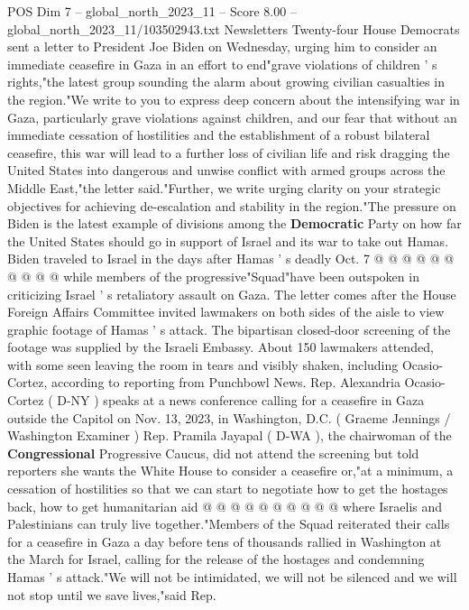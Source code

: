 \begin{textsample}{POS Dim 7 – global\_north\_2023\_11 – Score 8.00 – global\_north\_2023\_11/103502943.txt}  \label{ex:f7_pos_136}
Newsletters Twenty-four House Democrats sent a letter to President Joe Biden on Wednesday, urging him to consider an immediate ceasefire in Gaza in an effort to end"grave violations of children ' s rights,"the latest group sounding the alarm about growing civilian casualties in the region."We write to you to express deep concern about the intensifying war in Gaza, particularly grave violations against children, and our fear that without an immediate cessation of hostilities and the establishment of a robust bilateral ceasefire, this war will lead to a further loss of civilian life and risk dragging the United States into dangerous and unwise conflict with armed groups across the Middle East,"the letter said."Further, we write urging clarity on your strategic objectives for achieving de-escalation and stability in the region."The pressure on Biden is the latest example of divisions among the \textbf{Democratic} Party on how far the United States should go in support of Israel and its war to take out Hamas.
Biden traveled to Israel in the days after Hamas ' s deadly Oct. 7 @ @ @ @ @ @ @ @ @ @ while members of the progressive"Squad"have been outspoken in criticizing Israel ' s retaliatory assault on Gaza.
The letter comes after the House Foreign Affairs Committee invited lawmakers on both sides of the aisle to view graphic footage of Hamas ' s attack.
The bipartisan closed-door screening of the footage was supplied by the Israeli Embassy.
About 150 lawmakers attended, with some seen leaving the room in tears and visibly shaken, including Ocasio-Cortez, according to reporting from Punchbowl News.
Rep.
Alexandria Ocasio-Cortez ( D-NY ) speaks at a news conference calling for a ceasefire in Gaza outside the Capitol on Nov. 13, 2023, in Washington, D.C. ( Graeme Jennings / Washington Examiner ) Rep.
Pramila Jayapal ( D-WA ), the chairwoman of the \textbf{Congressional} Progressive Caucus, did not attend the screening but told reporters she wants the White House to consider a ceasefire or,"at a minimum, a cessation of hostilities so that we can start to negotiate how to get the hostages back, how to get humanitarian aid @ @ @ @ @ @ @ @ @ @ where Israelis and Palestinians can truly live together."Members of the Squad reiterated their calls for a ceasefire in Gaza a day before tens of thousands rallied in Washington at the March for Israel, calling for the release of the hostages and condemning Hamas ' s attack."We will not be intimidated, we will not be silenced and we will not stop until we save lives,"said Rep.

\end{textsample}
